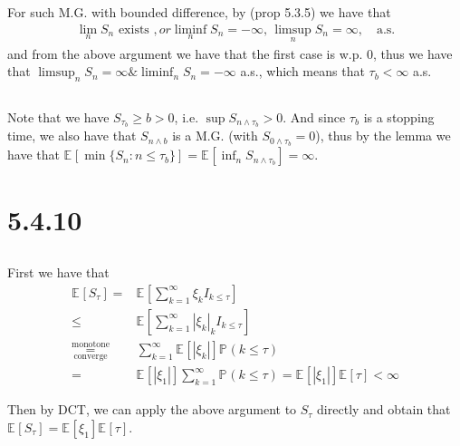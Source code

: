 \documentclass[11pt,a4paper]{ctexart}
\numberwithin{equation}{section}%
\begin{document}
For such M.G. with bounded difference, by (prop 5.3.5) we have that 
\begin{align*}
    \lim_n S_n \text{ exists }, or \liminf_n S_n = -\infty,\, \limsup_n S_n = \infty,\quad \text{a.s.}
\end{align*}
and from the above argument we have that the first case is w.p. 0, thus we have that $ \limsup_n S_n = \infty \& \liminf_n S_n = -\infty $ a.s., which means that $ \tau_b<\infty $ a.s.

\subsection{}

Note that we have $ S_{\tau_b} \geq b >0 $, i.e. $ \sup S_{n\wedge \tau_b} >0 $. And since $ \tau_b $ is a stopping time, we also have that $ S_{n\wedge b} $ is a M.G. (with $ S_{0\wedge \tau_b}=0 $), thus by the lemma we have that $ \mathbb{E}_{  }\left[ \min\{S_n:n\leq \tau_b \}\right] =  \mathbb{E}_{  }\left[ \inf_n S_{n\wedge \tau_b} \right] = \infty  $.



\section{5.4.10}


\subsection{}
First we have that
\begin{align*}
    \mathbb{E}_{  }\left[ S_\tau \right]=& \mathbb{E}_{  }\left[ \sum_{k=1}^\infty \xi _k I_{k\leq \tau} \right] \\
    \leq& \mathbb{E}_{  }\left[ \sum_{k=1}^\infty \left\vert \xi _k \right\vert  _k I_{k\leq \tau} \right]\\
    \mathop{ = }\limits^{\text{monotone}}_{\text{converge}} & \sum_{k=1}^\infty \mathbb{E}_{  }\left[ \left\vert \xi _k \right\vert  \right] \mathbb{P}_{  }\left( k\leq \tau \right) \\
    =&\mathbb{E}_{  }\left[ \left\vert \xi _1 \right\vert  \right]\sum_{k=1}^\infty \mathbb{P}_{  }\left( k\leq \tau \right) = \mathbb{E}_{  }\left[ \left\vert \xi _1 \right\vert  \right] \mathbb{E}_{  }\left[ \tau \right] <\infty
\end{align*}

Then by DCT, we can apply the above argument to $ S_\tau $ directly and obtain that $ \mathbb{E}_{  }\left[ S_\tau \right] = \mathbb{E}_{  }\left[ \xi _1 \right] \mathbb{E}_{  }\left[ \tau \right]   $.
\end{document}
